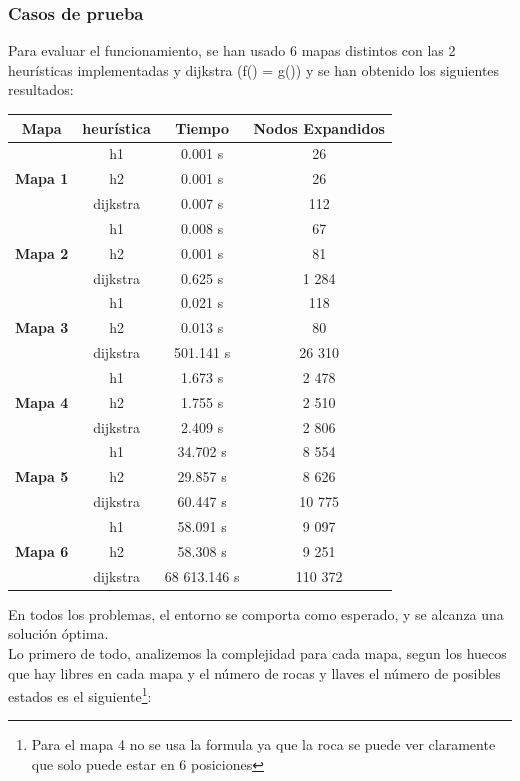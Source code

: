 \documentclass[11pt,spanish]{article}
\begin{document}
		\subsubsection{Casos de prueba}
			Para evaluar el funcionamiento, se han usado 6 mapas distintos con las 2 heurísticas implementadas y dijkstra (f() = g()) y se han obtenido los siguientes resultados:\\
			\begin{center}
			\begin{tabular}{|c||c|c|c|}
				\hline
				\textbf{Mapa}&\textbf{heurística}&\textbf{Tiempo}&\textbf{Nodos Expandidos}\\
				\hline
				\hline
				\multirow{3}{*}{\textbf{Mapa 1}} & h1 & 0.001 s & 26\\
												& h2 & 0.001 s & 26\\
												& dijkstra & 0.007 s & 112\\
				\hline
				\multirow{3}{*}{\textbf{Mapa 2}} & h1 & 0.008 s & 67\\
												& h2 & 0.001 s & 81\\
												& dijkstra & 0.625 s & 1 284\\
				\hline
				\multirow{3}{*}{\textbf{Mapa 3}} & h1 & 0.021 s & 118\\
												& h2 & 0.013 s & 80\\
												& dijkstra & 501.141 s & 26 310\\
				\hline
				\multirow{3}{*}{\textbf{Mapa 4}} & h1 & 1.673 s & 2 478\\
												& h2 & 1.755 s & 2 510\\
												& dijkstra & 2.409 s & 2 806\\
				\hline
				\multirow{3}{*}{\textbf{Mapa 5}} & h1 & 34.702 s & 8 554\\
												& h2 & 29.857 s & 8 626\\
												& dijkstra & 60.447 s & 10 775\\
				\hline
				\multirow{3}{*}{\textbf{Mapa 6}} & h1 & 58.091 s & 9 097\\
												& h2 & 58.308 s & 9 251\\
												& dijkstra & 68 613.146 s & 110 372\\
				\hline
			\end{tabular}
			\end{center}
			En todos los problemas, el entorno se comporta como esperado, y se alcanza una solución óptima.
			\\
			Lo primero de todo, analizemos la complejidad para cada mapa, segun los huecos que hay libres en cada mapa y el número de rocas y llaves el número de posibles estados es el siguiente\footnote{Para el mapa 4 no se usa  la formula ya que la roca se puede ver claramente que solo puede estar en 6 posiciones}:
\end{document}
